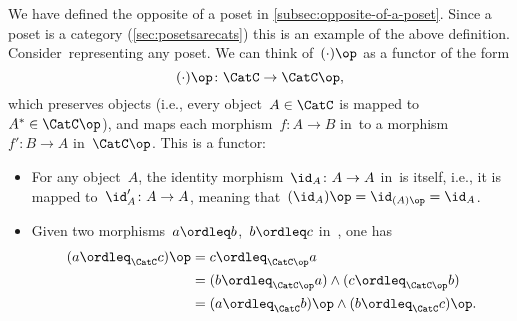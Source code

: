 \begin{example}
    We have defined the opposite of a poset in \cref{subsec:opposite-of-a-poset}.
    Since a poset is a category (\cref{sec:posetsarecats})
    this is an example of the above definition. Consider~\CatC representing any poset. We can think of~$(\cdot)\op$ as a functor of the form
    \begin{equation}
    (\cdot)
        \op\colon \CatC \to \CatC\op,
    \end{equation}
    which preserves objects (i.e., every object~$A \in \CatC$ is mapped to~$A^*\in \CatC\op$), and maps each morphism~$f\colon A\to B$ in~\CatC to a morphism~$f'\colon B\to A$ in~$\CatC\op$. This is a functor:
    \begin{itemize}
        \item For any object~$A$, the identity morphism~$\id_A\colon A\to A$ in~\CatC is itself, i.e., it is mapped to~$\id_A'\colon A\to A$, meaning that~$(\id_A)\op=\id_{(A)\op}=\id_A$.
        \item Given two morphisms~$a\ordleq b$,~$b\ordleq c$ in~\CatC, one has
        \begin{equation}
            \begin{aligned}
            (a\ordleq_{\CatC} c)
                \op &=c\ordleq_{\CatC\op} a\\
                &=(b\ordleq_{\CatC\op} a)\wedge (c\ordleq_{\CatC\op}b)\\
                &=(a\ordleq_{\CatC} b)\op \wedge (b\ordleq_{\CatC} c)\op.
            \end{aligned}
        \end{equation}
    \end{itemize}
\end{example}








